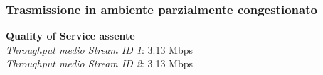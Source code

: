 \documentclass[aspectratio=169]{beamer}
\begin{document}
\begin{frame}
    \frametitle{Trasmissione in ambiente parzialmente congestionato}
    \centering
    \hspace{0.05\textwidth} %
    \begin{minipage}{0.9\textwidth}
        \begin{minipage}{0.45\textwidth}
            \textbf{Quality of Service assente}\\
            \textit{Throughput medio Stream ID 1}: 3.13 Mbps\\
            \textit{Throughput medio Stream ID 2}: 3.13 Mbps\\
            
            \vspace{1cm}
            

\end{minipage}
\end{minipage}
\end{frame}
\end{document}
